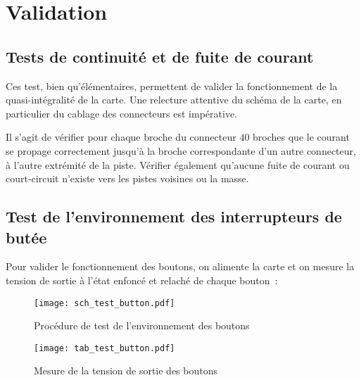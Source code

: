 
\section{Validation}

\subsection{Tests de continuité et de fuite de courant}

Ces test, bien qu'élémentaires, permettent de valider la fonctionnement de la quasi-intégralité de la carte. Une relecture attentive du schéma de la carte, en particulier du cablage des connecteurs est impérative.

\vspace{1cm}

Il s'agit de vérifier pour chaque broche du connecteur $40$ broches que le courant se propage correctement jusqu'à la broche correspondante d'un autre connecteur, à l'autre extrémité de la piste. Vérifier également qu'aucune fuite de courant ou court-circuit n'existe vers les pistes voisines ou la masse.

\subsection{Test de l'environnement des interrupteurs de butée}

Pour valider le fonctionnement des boutons, on alimente la carte et on mesure la tension de sortie à l'état enfoncé et relaché de chaque bouton~:

\begin{figure}[H]
    \centering
    \texttt{[image: sch\_test\_button.pdf]}
    \decoRule
    \caption[
    Procédure de test de l'environnement des boutons]{
    Procédure de test de l'environnement des boutons}
    \label{fig:Procédure de test de l'environnement des boutons}
	\end{figure}

\begin{figure}[H]
    \centering
	\texttt{[image: tab\_test\_button.pdf]}
    \decoRule
    \caption[
    Mesure de la tension de sortie des boutons]{
    Mesure de la tension de sortie des boutons}
    \label{fig:Mesure de la tension de sortie des boutons}
	\end{figure}


